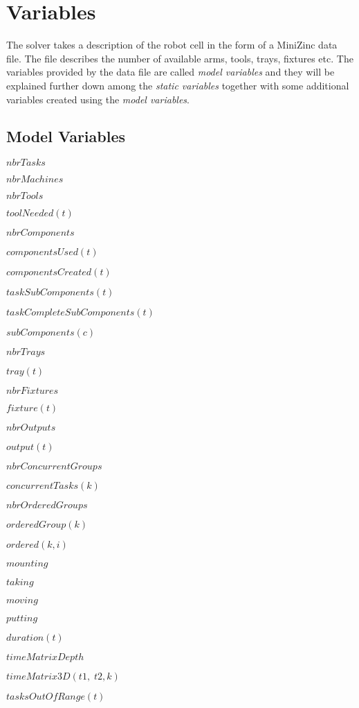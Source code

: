  \section{Variables}
 The solver takes a description of the robot cell in the form of a MiniZinc data file. The file describes the number of available arms, tools, trays, fixtures etc. The variables provided by the data file are called \emph{model variables} and they will be explained further down among the \emph{static variables} together with some additional variables created using the \emph{model variables}.
 
 \subsection{Model Variables}
\begin{itemize*}
\item $nbrTasks$
\item $nbrMachines$
\item $nbrTools$
\item $toolNeeded(t)$
\item $nbrComponents$
\item $componentsUsed(t)$
\item $componentsCreated(t)$
\item $taskSubComponents(t)$
\item $taskCompleteSubComponents(t)$
\item $subComponents(c)$
\item $nbrTrays$
\item $tray(t)$
\item $nbrFixtures$
\item $fixture(t)$
\item $nbrOutputs$
\item $output(t)$
\item $nbrConcurrentGroups$
\item $concurrentTasks(k)$
\item $nbrOrderedGroups$
\item $orderedGroup(k)$
\item $ordered(k,i)$
\item $mounting$
\item $taking$
\item $moving$
\item $putting$
\item $duration(t)$
\item $timeMatrixDepth$
\item $timeMatrix3D(t1, \; t2, k)$
\item $tasksOutOfRange(t)$
\end{itemize*}
  
